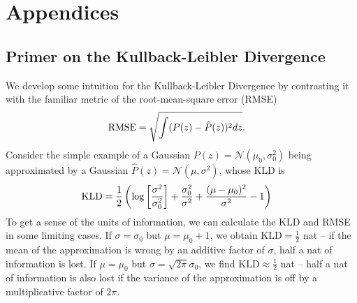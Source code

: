 \renewcommand{\chapid}{app}

\chapter*{Appendices }
\setcounter{chapter}{-1}
\setcounter{section}{0}
\setcounter{subsection}{0}
\renewcommand{\thefigure}{\thesection.\arabic{figure}}
\renewcommand{\thetable}{\thesection.\arabic{table}}
\renewcommand{\theequation}{\thesection.\arabic{equation}}
\renewcommand{\thesection}{\Alph{section}}



%
%
%


\section{Primer on the Kullback-Leibler Divergence}
\label{app:kld}

We develop some intuition for the Kullback-Leibler Divergence by contrasting it 
with the familiar metric of the root-mean-square error (RMSE)
\begin{align}
\eqlabel{eq:rmse}
\mathrm{RMSE} &= \sqrt{\int (P(z) - \hat{P}(z))^{2} dz}.
\end{align}
Consider the simple example of a Gaussian $P(z) = \mathcal{N}(\mu_{0}, 
\sigma_{0}^{2})$ being approximated by a Gaussian $\hat{P}(z) = 
\mathcal{N}(\mu, \sigma^{2})$, whose KLD is
\begin{align}
\eqlabel{eq:gaussian}
\mathrm{KLD} &= 
\frac{1}{2}\left(\log\left[\frac{\sigma^{2}}{\sigma_{0}^{2}}\right] + 
\frac{\sigma_{0}^{2}}{\sigma^{2}} + \frac{(\mu-\mu_{0})^{2}}{\sigma^{2}} - 
1\right)
\end{align}
To get a sense of the units of information, we can calculate the KLD and RMSE 
in some limiting cases.
If $\sigma=\sigma_{0}$ but $\mu=\mu_{0}+1$, we obtain 
$\mathrm{KLD}=\frac{1}{2}$ nat -- if the mean of the approximation is wrong by 
an additive factor of $\sigma$, half a nat of information is lost.
If $\mu=\mu_{0}$ but $\sigma=\sqrt{2\pi}\sigma_{0}$, we find 
$\mathrm{KLD}\approx\frac{1}{2}$ nat -- half a nat of information is also lost 
if the variance of the approximation is off by a multiplicative factor of 
$2\pi$.

